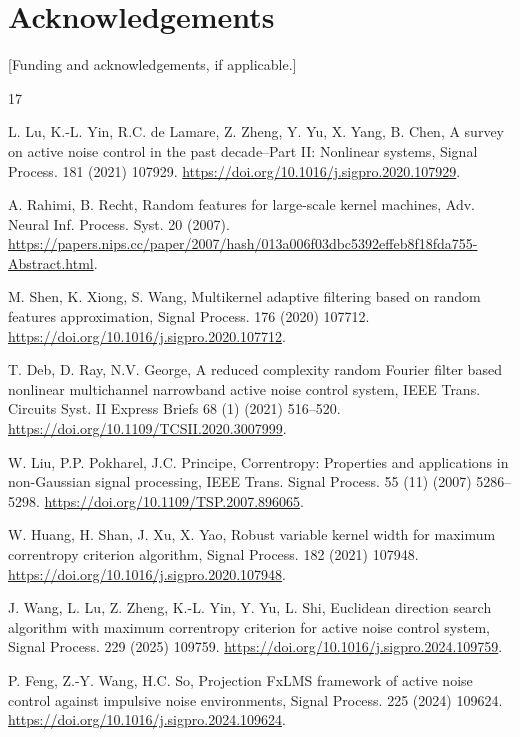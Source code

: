 \documentclass[preprint,12pt]{elsarticle}
\begin{document}
\section*{Acknowledgements}
[Funding and acknowledgements, if applicable.]

\begin{thebibliography}{17}

L. Lu, K.-L. Yin, R.C. de Lamare, Z. Zheng, Y. Yu, X. Yang, B. Chen, A survey on active noise control in the past decade--Part II: Nonlinear systems, Signal Process. 181 (2021) 107929. \url{https://doi.org/10.1016/j.sigpro.2020.107929}.

A. Rahimi, B. Recht, Random features for large-scale kernel machines, Adv. Neural Inf. Process. Syst. 20 (2007). \url{https://papers.nips.cc/paper/2007/hash/013a006f03dbc5392effeb8f18fda755-Abstract.html}.

M. Shen, K. Xiong, S. Wang, Multikernel adaptive filtering based on random features approximation, Signal Process. 176 (2020) 107712. \url{https://doi.org/10.1016/j.sigpro.2020.107712}.

T. Deb, D. Ray, N.V. George, A reduced complexity random Fourier filter based nonlinear multichannel narrowband active noise control system, IEEE Trans. Circuits Syst. II Express Briefs 68 (1) (2021) 516--520. \url{https://doi.org/10.1109/TCSII.2020.3007999}.

W. Liu, P.P. Pokharel, J.C. Principe, Correntropy: Properties and applications in non-Gaussian signal processing, IEEE Trans. Signal Process. 55 (11) (2007) 5286--5298. \url{https://doi.org/10.1109/TSP.2007.896065}.

W. Huang, H. Shan, J. Xu, X. Yao, Robust variable kernel width for maximum correntropy criterion algorithm, Signal Process. 182 (2021) 107948. \url{https://doi.org/10.1016/j.sigpro.2020.107948}.

J. Wang, L. Lu, Z. Zheng, K.-L. Yin, Y. Yu, L. Shi, Euclidean direction search algorithm with maximum correntropy criterion for active noise control system, Signal Process. 229 (2025) 109759. \url{https://doi.org/10.1016/j.sigpro.2024.109759}.

P. Feng, Z.-Y. Wang, H.C. So, Projection FxLMS framework of active noise control against impulsive noise environments, Signal Process. 225 (2024) 109624. \url{https://doi.org/10.1016/j.sigpro.2024.109624}.


\end{thebibliography}
\end{document}
